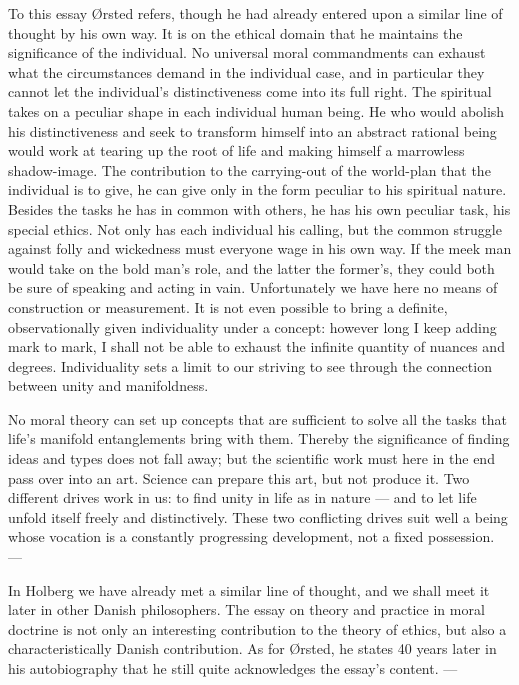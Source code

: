 \documentclass[12pt,a4paper]{book}
\newcommand{\opage}[1]{\marginnote{\footnotesize\textit{[#1]}}}
\begin{document}
To this essay Ørsted refers, though he had already entered upon a similar line of thought
by his own way. It is on the ethical domain that he maintains the significance of the
individual. No universal moral commandments can exhaust what the circumstances demand in
the individual case, and in particular they cannot let the individual's distinctiveness
come into its full right. The spiritual takes on a peculiar shape in each individual human
being. He who would abolish his distinctiveness and seek to transform himself into an
abstract rational being would work at tearing up the root of life and making himself a
marrowless shadow-image. The contribution to the carrying-out of the world-plan that the
individual is to give, he can give only in the form peculiar to his spiritual nature.
Besides the tasks he has in common with others, he has his own peculiar task, his special
ethics. Not only has each individual his calling, but the common struggle against folly and
wickedness must everyone wage in his own way. If the meek man would take on the bold man's
role, and the latter the former's, they could both be sure of speaking and acting in vain.
Unfortunately we have here no means of construction or measurement. It is not even possible
to bring a definite, \opage{79}observationally given individuality under a concept: however long I
keep adding mark to mark, I shall not be able to exhaust the infinite quantity of nuances
and degrees. Individuality sets a limit to our striving to see through the connection
between unity and manifoldness.

No moral theory can set up concepts that are sufficient to solve all the tasks that life's
manifold entanglements bring with them. Thereby the significance of finding ideas and types
does not fall away; but the scientific work must here in the end pass over into an art.
Science can prepare this art, but not produce it. Two different drives work in us: to find
unity in life as in nature --- and to let life unfold itself freely and distinctively.
These two conflicting drives suit well a being whose vocation is a constantly progressing
development, not a fixed possession. ---

In Holberg we have already met a similar line of thought, and we shall meet it later in
other Danish philosophers. The essay on theory and practice in moral doctrine is not only
an interesting contribution to the theory of ethics, but also a characteristically Danish
contribution. As for Ørsted, he states 40 years later in his autobiography that he still
quite acknowledges the essay's content. ---
\end{document}
